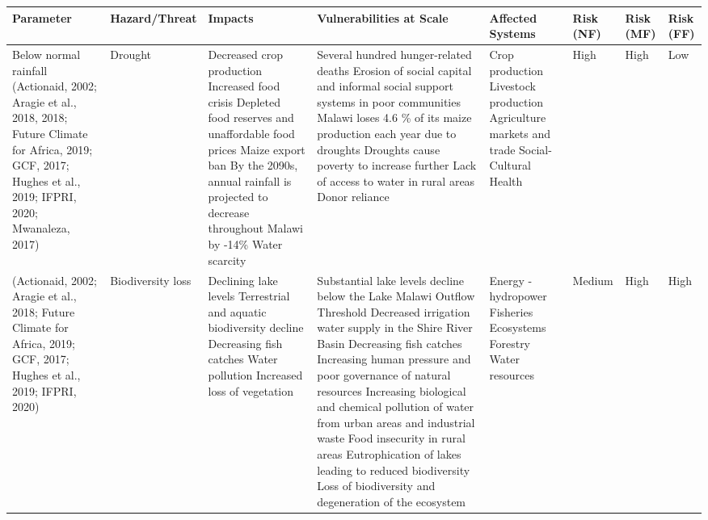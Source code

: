 \documentclass[
]{book}
\begin{document}
\begin{longtable}[]{@{}
  >{\centering\arraybackslash}p{}
  >{\centering\arraybackslash}p{}
  >{\raggedright\arraybackslash}p{}
  >{\raggedright\arraybackslash}p{}
  >{\centering\arraybackslash}p{}
  >{\centering\arraybackslash}p{}
  >{\centering\arraybackslash}p{}
  >{\centering\arraybackslash}p{}@{}}
\toprule
\textbf{Parameter} & \textbf{Hazard/Threat} & \textbf{Impacts} & \textbf{Vulnerabilities at Scale} & \textbf{Affected Systems} & \textbf{Risk (NF)} & \textbf{Risk (MF)} & \textbf{Risk (FF)} \\
\midrule
\endhead
Below normal rainfall (Actionaid, 2002; Aragie et al., 2018, 2018; Future Climate for Africa, 2019; GCF, 2017; Hughes et al., 2019; IFPRI, 2020; Mwanaleza, 2017) & Drought & Decreased crop production Increased food crisis Depleted food reserves and unaffordable food prices Maize export ban By the 2090s, annual rainfall is projected to decrease throughout Malawi by -14\% Water scarcity & Several hundred hunger-related deaths Erosion of social capital and informal social support systems in poor communities Malawi loses 4.6 \% of its maize production each year due to droughts Droughts cause poverty to increase further Lack of access to water in rural areas Donor reliance & Crop production Livestock production Agriculture markets and trade Social-Cultural Health & High & High & Low \\
(Actionaid, 2002; Aragie et al., 2018; Future Climate for Africa, 2019; GCF, 2017; Hughes et al., 2019; IFPRI, 2020) & Biodiversity loss & Declining lake levels Terrestrial and aquatic biodiversity decline Decreasing fish catches Water pollution Increased loss of vegetation & Substantial lake levels decline below the Lake Malawi Outflow Threshold Decreased irrigation water supply in the Shire River Basin Decreasing fish catches Increasing human pressure and poor governance of natural resources Increasing biological and chemical pollution of water from urban areas and industrial waste Food insecurity in rural areas Eutrophication of lakes leading to reduced biodiversity Loss of biodiversity and degeneration of the ecosystem & Energy - hydropower Fisheries Ecosystems Forestry Water resources & Medium & High & High \\

\end{longtable}
\end{document}
